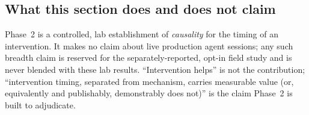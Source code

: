 \subsection{What this section does and does not claim}
\label{sec:intervention:scope}

Phase~2 is a controlled, lab establishment of \emph{causality} for the timing
of an intervention. It makes no claim about live production agent sessions; any
such breadth claim is reserved for the separately-reported, opt-in field study
and is never blended with these lab results. ``Intervention helps'' is not the
contribution; ``intervention timing, separated from mechanism, carries
measurable value (or, equivalently and publishably, demonstrably does not)'' is
the claim Phase~2 is built to adjudicate.
